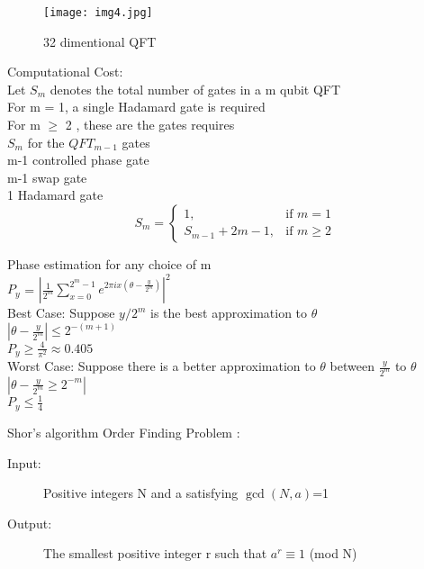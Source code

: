 \documentclass[12pt]{beamer}
\begin{document}
\begin{frame}
\begin{figure}[hbtp]
\centering
\texttt{[image: img4.jpg]}
\caption{32 dimentional QFT}
\end{figure}
\end{frame}
\begin{frame}
Computational Cost:\\
\vspace{1cm}
Let $S_m$ denotes the total number of gates in a m qubit QFT\\
For m = 1, a single Hadamard gate is required \\
 For m $\geq$ 2 , these are the gates requires \\
\hspace{2cm} $S_m$ for the $QFT_{m-1}$ gates\\
\hspace{2cm} m-1 controlled  phase gate \\
\hspace{2cm} m-1 swap gate \\
\hspace{2cm} 1 Hadamard gate \\
\[
    \ S_m =
    \begin{cases}
        1, & \text{if } m = 1 \\
        S_{m-1} + 2m-1, & \text{if } m \geq 2
    \end{cases}
\] 

\end{frame}
\begin{frame}
Phase estimation for any  choice of m\\
$P_y$ = $|\frac{1}{2^m}\sum_{x=0}^{2^m-1} e^{2\pi i x (\theta - \frac{y}{2^m})}|^2$ \\
\vspace{1cm}
Best Case:
Suppose $y/2^m$ is the best approximation to $\theta$\\
$|\theta - \frac{y}{2^m}|\leq 2^{-(m+1)}$\\
$P_y \geq \frac{4}{\pi^2} \approx 0.405$ \\
\vspace{1cm}
Worst Case:
Suppose there is a better approximation to $\theta$ between $\frac{y}{2^m}$ to $\theta$\\
$|\theta - \frac{y}{2^m}\geq 2^{-m}|$\\
$P_y \leq \frac{1}{4}$\\
\end{frame}
\begin{frame}{Shor's algorithm}
Order Finding Problem :
\begin{description}
\item[Input: ] Positive integers N and a satisfying $\gcd(N,a)$=1
\item[Output: ] The smallest positive integer r such that $ a^r \equiv 1 $ (mod N)
\end{description}
\end{frame}
\end{document}
